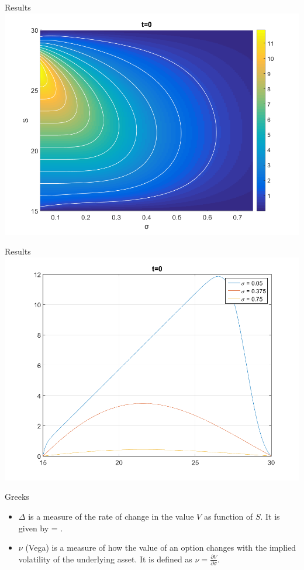 \documentclass{beamer}
\numberwithin{equation}{section}
\newcommand{\pdrv}[2][x]{\frac{\partial #2}{\partial #1}}
\begin{document}
\begin{frame}{Results}
    \centering
      \includegraphics[width=1\textwidth]{../plots/sigma_field}
\end{frame}

\begin{frame}{Results}
    \centering
      \includegraphics[width=1\textwidth]{../plots/sigma_lines}
\end{frame}

\begin{frame}{Greeks}
\begin{itemize}
  \item{$\Delta$ is a measure of the rate of change in the value $V$ as function of $S$. It is given by \Delta = \pdrv[S]V.}

  \item{$\nu$ (Vega) is a measure of how the value of an option changes with the implied volatility of the underlying asset. It is defined as $\nu = \pdrv[\sigma]{V}$.}
\end{itemize}
\end{frame}
\end{document}
